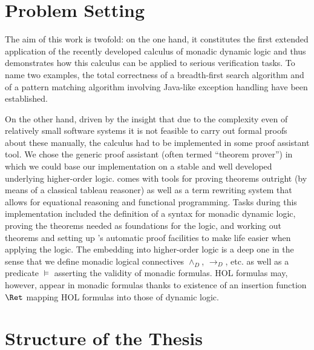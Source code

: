 \section{Problem Setting}
\label{sec:problem-setting}
The aim of this work is twofold: on the one hand, it constitutes the first
extended application of the recently developed calculus of monadic dynamic logic
 and thus demonstrates how this calculus can be
applied to serious verification tasks. To name two examples, the total
correctness of a breadth-first search algorithm and of a pattern matching
algorithm involving Java\TM-like exception handling have been established. 

On the other hand, driven by the insight that due to the complexity even of
relatively small software systems it is not feasible to carry out formal proofs
about these manually, the calculus had to be implemented in some proof assistant
tool. We chose the generic proof assistant (often termed ``theorem
prover'') \IsabelleHOL in which we could base our implementation on a stable and
well developed underlying higher-order logic. \IsabelleHOL comes with
tools for proving theorems outright (by means of a classical tableau reasoner)
as well as a term rewriting system that allows for equational reasoning and
functional programming. Tasks during this implementation included the definition
of a syntax for monadic dynamic logic, proving the theorems needed as
foundations for the logic, and working out theorems and setting up \Isabelle's
automatic proof facilities to make
life easier when applying the logic. The embedding into higher-order logic is a
deep one in the sense that we define monadic logical connectives $\land_D$, $\longrightarrow_D$,
etc. as well as a predicate $\models$ asserting the validity of
monadic formulas. HOL formulas may, however, appear in monadic formulas thanks to
existence of an insertion function $\Ret$ mapping HOL formulas into
those of dynamic logic.

\section{Structure of the Thesis}
\label{sec:structure-thesis}




